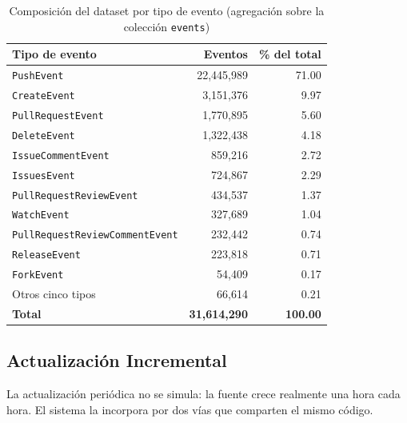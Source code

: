 \begin{table}[H]
\centering
\caption{Composición del dataset por tipo de evento (agregación sobre la colección \texttt{events})}
\label{tab:tipos}
\vspace{0.2cm}
\small
\begin{tabular}{@{}lrr@{}}
\toprule
\textbf{Tipo de evento} & \textbf{Eventos} & \textbf{\% del total} \\
\midrule
\texttt{PushEvent}                      & 22,445,989 & 71.00 \\
\texttt{CreateEvent}                    &  3,151,376 &  9.97 \\
\texttt{PullRequestEvent}               &  1,770,895 &  5.60 \\
\texttt{DeleteEvent}                    &  1,322,438 &  4.18 \\
\texttt{IssueCommentEvent}              &    859,216 &  2.72 \\
\texttt{IssuesEvent}                    &    724,867 &  2.29 \\
\texttt{PullRequestReviewEvent}         &    434,537 &  1.37 \\
\texttt{WatchEvent}                     &    327,689 &  1.04 \\
\texttt{PullRequestReviewCommentEvent}  &    232,442 &  0.74 \\
\texttt{ReleaseEvent}                   &    223,818 &  0.71 \\
\texttt{ForkEvent}                      &     54,409 &  0.17 \\
Otros cinco tipos                       &     66,614 &  0.21 \\
\midrule
\textbf{Total}                          & \textbf{31,614,290} & \textbf{100.00} \\
\bottomrule
\end{tabular}
\end{table}

\subsection{Actualización Incremental}

La actualización periódica no se simula: la fuente crece realmente una hora cada hora. El sistema la incorpora por dos vías que comparten el mismo código.

